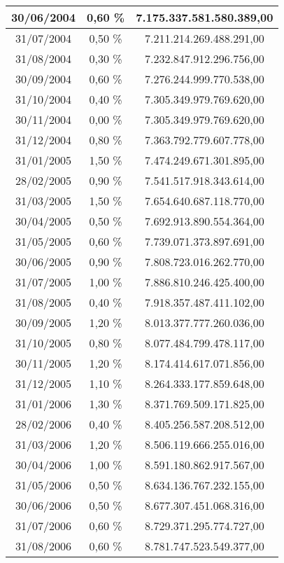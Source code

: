 \begin{center}
\begin{longtable}{|c|c|c|}
30/06/2004 & 0,60 \% & 7.175.337.581.580.389,00  \\ \hline
31/07/2004 & 0,50 \% & 7.211.214.269.488.291,00  \\ \hline
31/08/2004 & 0,30 \% & 7.232.847.912.296.756,00  \\ \hline
30/09/2004 & 0,60 \% & 7.276.244.999.770.538,00  \\ \hline
31/10/2004 & 0,40 \% & 7.305.349.979.769.620,00  \\ \hline
30/11/2004 & 0,00 \% & 7.305.349.979.769.620,00  \\ \hline
31/12/2004 & 0,80 \% & 7.363.792.779.607.778,00  \\ \hline
31/01/2005 & 1,50 \% & 7.474.249.671.301.895,00  \\ \hline
28/02/2005 & 0,90 \% & 7.541.517.918.343.614,00  \\ \hline
31/03/2005 & 1,50 \% & 7.654.640.687.118.770,00  \\ \hline
30/04/2005 & 0,50 \% & 7.692.913.890.554.364,00  \\ \hline
31/05/2005 & 0,60 \% & 7.739.071.373.897.691,00  \\ \hline
30/06/2005 & 0,90 \% & 7.808.723.016.262.770,00  \\ \hline
31/07/2005 & 1,00 \% & 7.886.810.246.425.400,00  \\ \hline
31/08/2005 & 0,40 \% & 7.918.357.487.411.102,00  \\ \hline
30/09/2005 & 1,20 \% & 8.013.377.777.260.036,00  \\ \hline
31/10/2005 & 0,80 \% & 8.077.484.799.478.117,00  \\ \hline
30/11/2005 & 1,20 \% & 8.174.414.617.071.856,00  \\ \hline
31/12/2005 & 1,10 \% & 8.264.333.177.859.648,00  \\ \hline
31/01/2006 & 1,30 \% & 8.371.769.509.171.825,00  \\ \hline
28/02/2006 & 0,40 \% & 8.405.256.587.208.512,00  \\ \hline
31/03/2006 & 1,20 \% & 8.506.119.666.255.016,00  \\ \hline
30/04/2006 & 1,00 \% & 8.591.180.862.917.567,00  \\ \hline
31/05/2006 & 0,50 \% & 8.634.136.767.232.155,00  \\ \hline
30/06/2006 & 0,50 \% & 8.677.307.451.068.316,00  \\ \hline
31/07/2006 & 0,60 \% & 8.729.371.295.774.727,00  \\ \hline
31/08/2006 & 0,60 \% & 8.781.747.523.549.377,00  \\ \hline

\end{longtable}
\end{center}
